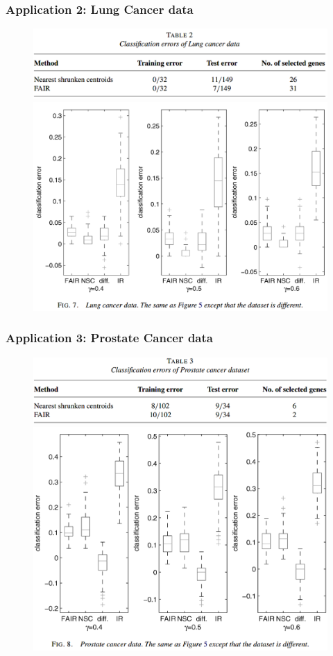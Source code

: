 \documentclass{beamer}
\begin{document}
	
	\begin{frame}
		\frametitle{Application 2: Lung Cancer data}
	\begin{figure}
		\includegraphics[width=.8\linewidth]{image019.png}
		\includegraphics[width=.7\linewidth]{image020.png}
	\end{figure} 	
	\end{frame}
	
	\begin{frame}
		\frametitle{Application 3: Prostate Cancer data}
	\begin{figure}
		\includegraphics[width=.8\linewidth]{image021.png}
		\includegraphics[width=.7\linewidth]{image022.png}
	\end{figure} 	
	\end{frame}
	
	
\end{document}
